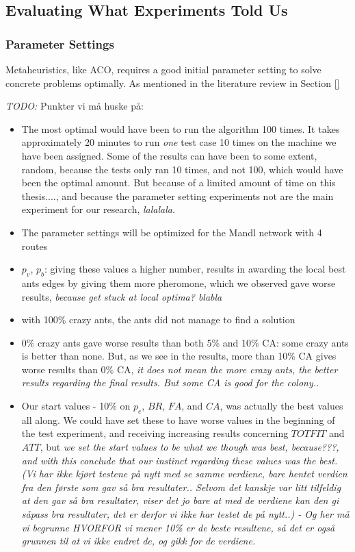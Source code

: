 \subsection{Evaluating What Experiments Told Us}
\subsubsection{Parameter Settings}

Metaheuristics, like ACO, requires a good initial parameter setting to solve concrete problems optimally. As mentioned in the literature review in Section \vref{}

\emph{\color{blue} TODO:}
Punkter vi må huske på:
\begin{itemize}
\item The most optimal would have been to run the algorithm 100 times. It takes approximately 20 minutes to run \textit{one} test case 10 times on the machine we have been assigned. %
Some of the results can have been to some extent, random, because the tests only ran 10 times, and not 100, which would have been the optimal amount. But because of a limited amount of time on this thesis...., and because the parameter setting experiments not are the main experiment for our research, \emph{\color{blue} lalalala}. 
\item The parameter settings will be optimized for the Mandl network with 4 routes
\item $p_v$, $p_b$: giving these values a higher number, results in awarding the local best ants edges by giving them more pheromone, which we observed gave worse results, \emph{\color{blue}because get stuck at local optima? blabla}
\item with 100\% crazy ants, the ants did not manage to find a solution 
\item 0\% crazy ants gave worse results than both 5\% and 10\% CA: some crazy ants is better than none. But, as we see in the results, more than 10\% CA gives worse results than 0\% CA, \emph{\color{blue} it does not mean the more crazy ants, the better results regarding the final results. But some CA is good for the colony..}
\item Our start values - 10\% on $p_e$, $BR$, $FA$, and $CA$, was actually the best values all along. We could have set these to have worse values in the beginning of the test experiment, and receiving increasing results concerning $TOTFIT$ and $ATT$, but \emph{\color{blue} we set the start values to be what we though was best, because???, and with this conclude that our instinct regarding these values was the best. (Vi har ikke kjørt testene på nytt med se samme verdiene, bare hentet verdien fra den første som gav så bra resultater.. Selvom det kanskje var litt tilfeldig at den gav så bra resultater, viser det jo bare at med de verdiene kan den gi såpass bra resultater, det er derfor vi ikke har testet de på nytt..) - Og her må vi begrunne HVORFOR vi mener 10\% er de beste resultene, så det er også grunnen til at vi ikke endret de, og gikk for de verdiene.}

\end{itemize}

